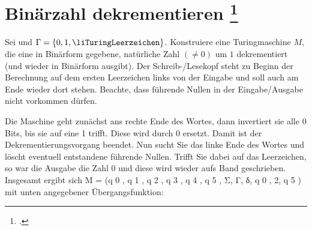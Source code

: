 \documentclass{lehramt-informatik-aufgabe}
\begin{document}
\section{Binärzahl dekrementieren
\footcite[Aufgabe 3]{theo:ab:3}}

Sei  und $\Gamma = \{ 0, 1, \liTuringLeerzeichen \}$.
Konstruiere eine Turingmaschine $M$, die eine in Binärform gegebene,
natürliche Zahl $(\neq 0)$ um $1$ dekrementiert (und wieder in Binärform
ausgibt). Der Schreib-/Lesekopf steht zu Beginn der Berechnung auf dem
ersten Leerzeichen links von der Eingabe und soll auch am Ende wieder
dort stehen. Beachte, dass führende Nullen in der Eingabe/Ausgabe nicht
vorkommen dürfen.

\begin{liAntwort}
Die Maschine geht zunächst ans rechte Ende des Wortes, dann invertiert
sie alle 0 Bits, bis sie auf eine 1 trifft. Diese wird durch 0 ersetzt.
Damit ist der Dekrementierungsvorgang beendet. Nun sucht Sie das linke
Ende des Wortes und löscht eventuell entstandene führende Nullen. Trifft
Sie dabei auf das Leerzeichen, so war die Ausgabe die Zahl 0 und diese
wird wieder aufs Band geschrieben. Insgesamt ergibt sich M = ({q 0 , q 1
, q 2 , q 3 , q 4 , q 5 }, Σ, Γ, δ, q 0 , 2, {q 5 }) mit unten
angegebener Übergangsfunktion:

\begin{center}
\end{center}
\end{liAntwort}
\end{document}
